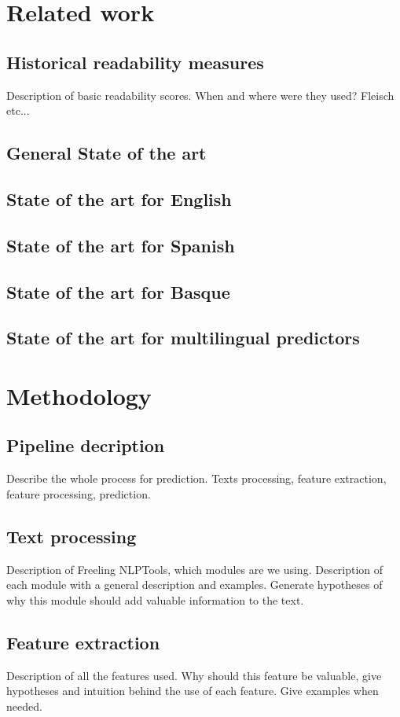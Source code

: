 \documentclass[12pt]{article}
\begin{document}
\section{Related work}
\subsection{Historical readability measures}
Description of basic readability scores. When and where were they used? Fleisch etc...
\subsection{General State of the art}

\subsection{State of the art for English}
\subsection{State of the art for Spanish}
\subsection{State of the art for Basque}

\subsection{State of the art for multilingual predictors}

\section{Methodology}
\subsection{Pipeline decription}
Describe the whole process for prediction. Texts processing, feature extraction, feature processing, prediction.

\subsection{Text processing}
Description of Freeling NLPTools, which modules are we using. Description of each module with a general description and examples. Generate hypotheses of why this module should add valuable information to the text.

\subsection{Feature extraction}
Description of all the features used. Why should this feature be valuable, give hypotheses and intuition behind the use of each feature. Give examples when needed.
\end{document}

